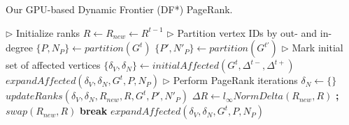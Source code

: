 \begin{algorithm}[!hbt]
\caption{Our GPU-based Dynamic Frontier (DF*) PageRank.}
\label{alg:frontier}
\begin{algorithmic}[1]

\Statex

  \State $\rhd$ Initialize ranks
  \State $R \gets R_{new} \gets R^{t-1}$ \label{alg:frontier--initialize}
  \State $\rhd$ Partition vertex IDs by out- and in-degree 
  \State $\{P, N_P\} \gets partition(G^t)$
  \State $\{P', N'_P\} \gets partition(G^{t'})$
  \State $\rhd$ Mark initial set of affected vertices
  \State $\{\delta_V, \delta_N\} \gets initialAffected(G^t, \Delta^{t-}, \Delta^{t+})$
  \State $expandAffected(\delta_V, \delta_N, G^t, P, N_P)$
  \State $\rhd$ Perform PageRank iterations
  \ForAll{$i \in [0 .. MAX\_ITERATIONS)$} \label{alg:frontier--compute-begin}
    \State $\delta_N \gets \{\}$
    \State $updateRanks(\delta_V, \delta_N, R_{new}, R, G^t, P', N'_P)$
    \State $\Delta R \gets l_{\infty}NormDelta(R_{new}, R)$ \textbf{;} $swap(R_{new}, R)$
     \textbf{break}
    \EndIf
    \State $expandAffected(\delta_V, \delta_N, G^t, P, N_P)$
  \EndFor \label{alg:frontier--compute-end}
  \State {} \label{alg:frontier--return}
\EndFunction
\end{algorithmic}
\end{algorithm}

